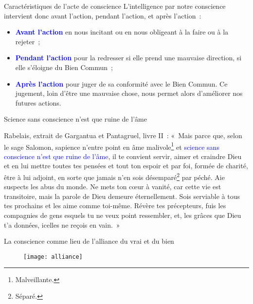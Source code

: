 \documentclass[11pt,xcolor=dvipsname,ignorenonframetext,handout]{beamer}
\begin{document}
\begin{frame}{Caractéristiques de l'acte de conscience}
    L'intelligence par notre conscience intervient donc avant l'action, pendant l'action, et après l'action~:
    \begin{itemize}
        \rightskip=0pt\leftskip=0pt
        \item \textcolor{blue}{\textbf{Avant l'action}} en nous incitant ou en nous obligeant à la faire ou à la rejeter~;
        \item \textcolor{blue}{\textbf{Pendant l'action}} pour la redresser si elle prend une mauvaise direction, si elle s'éloigne du Bien Commun~;
        \item \textcolor{blue}{\textbf{Après l'action}} pour juger de sa conformité avec le Bien Commun. Ce jugement, loin d'être une mauvaise chose, nous permet alors d'améliorer nos futures actions.
    \end{itemize}
\end{frame}
\begin{frame}{Science sans conscience n'est que ruine de l'âme}
    \begin{block}{Rabelais, extrait de Gargantua et Pantagruel, livre II~:}
    \rightskip=0pt\leftskip=0pt
    «~Mais parce que, selon le sage Salomon, sapience n'entre point en âme malivole\footnote[frame]{Malveillante.} et \textcolor{blue}{science sans conscience n'est que ruine de l'âme}, il te convient servir, aimer et craindre Dieu et en lui mettre toutes tes pensées et tout ton espoir et par foi, formée de charité, être à lui adjoint, en sorte que jamais n'en sois désemparé\footnote[frame]{Séparé.} par péché. Aie suspects les abus du monde. Ne mets ton cœur à vanité, car cette vie est transitoire, mais la parole de Dieu demeure éternellement. Sois serviable à tous tes prochains et les aime comme toi-même. Révère tes précepteurs, fuis les compagnies de gens esquels tu ne veux point ressembler, et, les grâces que Dieu t'a données, icelles ne reçois en vain.~»
\end{block}
\end{frame}
\begin{frame}{La conscience comme lieu de l'alliance du vrai et du bien}
    {
        \begin{figure}
          \centering
          \texttt{[image: alliance]}
        \end{figure}
          }
\end{frame}
\end{document}
